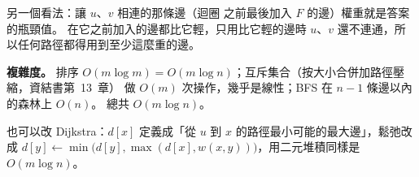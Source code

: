 \begin{pastsoln}
另一個看法：讓 $u$、$v$ 相連的那條邊（迴圈 \Break 之前最後加入 $F$ 的邊）權重就是答案的瓶頸值。
在它之前加入的邊都比它輕，只用比它輕的邊時 $u$、$v$ 還不連通，所以任何路徑都得用到至少這麼重的邊。

\textbf{複雜度。} 排序 $O(m \log m) = O(m \log n)$；互斥集合（按大小合併加路徑壓縮，資結書第~13~章）
做 $O(m)$ 次操作，幾乎是線性；BFS 在 $n - 1$ 條邊以內的森林上 $O(n)$。 總共 $O(m \log n)$。

也可以改 Dijkstra：$d[x]$ 定義成「從 $u$ 到 $x$ 的路徑最小可能的最大邊」，鬆弛改成
$d[y] \gets \min\bigl(d[y], \max(d[x], w(x, y))\bigr)$，用二元堆積同樣是 $O(m \log n)$。
\end{pastsoln}
